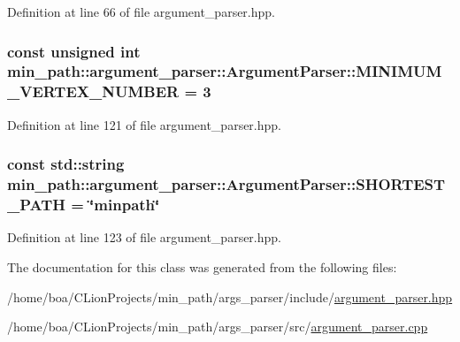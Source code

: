 Definition at line 66 of file argument\+\_\+parser.\+hpp.

\subsubsection[{\texorpdfstring{M\+I\+N\+I\+M\+U\+M\+\_\+\+V\+E\+R\+T\+E\+X\+\_\+\+N\+U\+M\+B\+ER}{MINIMUM_VERTEX_NUMBER}}]{\setlength{\rightskip}{0pt plus 5cm}const unsigned int min\+\_\+path\+::argument\+\_\+parser\+::\+Argument\+Parser\+::\+M\+I\+N\+I\+M\+U\+M\+\_\+\+V\+E\+R\+T\+E\+X\+\_\+\+N\+U\+M\+B\+ER = 3}\hypertarget{classmin__path_1_1argument__parser_1_1_argument_parser_a25b69ee820b15148121a85e344f6d26a}{}\label{classmin__path_1_1argument__parser_1_1_argument_parser_a25b69ee820b15148121a85e344f6d26a}


Definition at line 121 of file argument\+\_\+parser.\+hpp.

\subsubsection[{\texorpdfstring{S\+H\+O\+R\+T\+E\+S\+T\+\_\+\+P\+A\+TH}{SHORTEST_PATH}}]{\setlength{\rightskip}{0pt plus 5cm}const std\+::string min\+\_\+path\+::argument\+\_\+parser\+::\+Argument\+Parser\+::\+S\+H\+O\+R\+T\+E\+S\+T\+\_\+\+P\+A\+TH = \char`\"{}minpath\char`\"{}}\hypertarget{classmin__path_1_1argument__parser_1_1_argument_parser_a552c30c543bb251f8c43b528ce8d3537}{}\label{classmin__path_1_1argument__parser_1_1_argument_parser_a552c30c543bb251f8c43b528ce8d3537}


Definition at line 123 of file argument\+\_\+parser.\+hpp.



The documentation for this class was generated from the following files\+:\begin{DoxyCompactItemize}
\item 
/home/boa/\+C\+Lion\+Projects/min\+\_\+path/args\+\_\+parser/include/\hyperlink{argument__parser_8hpp}{argument\+\_\+parser.\+hpp}\item 
/home/boa/\+C\+Lion\+Projects/min\+\_\+path/args\+\_\+parser/src/\hyperlink{argument__parser_8cpp}{argument\+\_\+parser.\+cpp}\end{DoxyCompactItemize}
